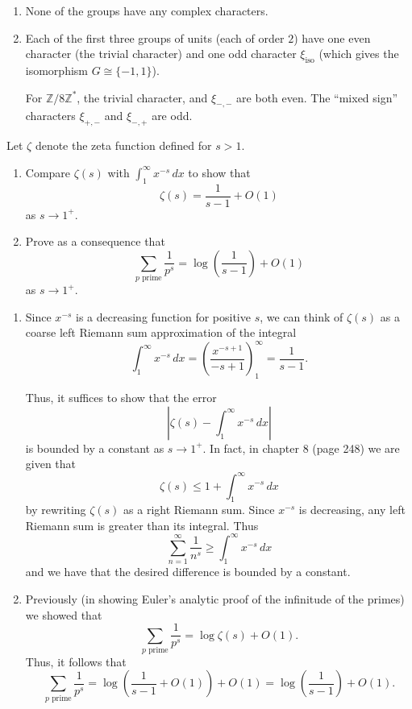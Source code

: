 \documentclass[12 pt, letterpaper]{hmcpset}
\begin{document}
\begin{solution}
	\begin{enumerate}
		\item None of the groups have any complex characters.

		\item Each of the first three groups of units (each of order $2$) have one even character (the trivial character) and one odd character $\xi_{\text{iso}}$ (which gives the isomorphism $G \cong \{ -1, 1 \}$).

			For $\mathbb{Z} / 8 \mathbb{Z}^{*}$, the trivial character, and $\xi_{-, -}$ are both even. The ``mixed sign'' characters $\xi_{+, -}$ and $\xi_{-, +}$ are odd.
	\end{enumerate}
\end{solution}

\pagebreak

\begin{problem}[S \& S \S 8.4 \#8]
	Let $\zeta$ denote the zeta function defined for $s > 1$.
	\begin{enumerate}
		\item Compare $\zeta(s)$ with $\int_{1}^{\infty} x^{-s} \, dx$ to show that
			\[
				\zeta(s) = \frac{1}{s - 1} + O(1)
			\]
			as $s \to 1^{+}$.

		\item Prove as a consequence that
			\[
				\sum_{p \text{ prime}} \frac{1}{p^{s}} = \log \left ( \frac{1}{s - 1} \right ) + O(1)
			\]
			as $s \to 1^{+}$.
	\end{enumerate}
\end{problem}

\begin{solution}
	\begin{enumerate}
		\item Since $x^{-s}$ is a decreasing function for positive $s$, we can think of $\zeta(s)$ as a coarse left Riemann sum approximation of the integral
			\[
				\int_{1}^{\infty} x^{-s} \, dx = \left ( \frac{x^{-s + 1}}{-s + 1} \right )_{1}^{\infty} = \frac{1}{s - 1}.
			\]

			Thus, it suffices to show that the error
			\[
				\left \lvert \zeta(s) - \int_{1}^{\infty} x^{-s} \, dx \right \rvert
			\]
			is bounded by a constant as $s \to 1^{+}$. In fact, in chapter 8 (page 248) we are given that
			\[
				\zeta(s) \le 1 + \int_{1}^{\infty} x^{-s} \, dx
			\]
			by rewriting $\zeta(s)$ as a right Riemann sum. Since $x^{-s}$ is decreasing, any left Riemann sum is greater than its integral. Thus
			\[
				\sum_{n = 1}^{\infty} \frac{1}{n^{s}} \ge \int_{1}^{\infty} x^{-s} \, dx 
			\]
			and we have that the desired difference is bounded by a constant.

		\item Previously (in showing Euler's analytic proof of the infinitude of the primes) we showed that
			\[
				\sum_{p \text{ prime}} \frac{1}{p^{s}} = \log \zeta(s) + O(1).
			\]
			Thus, it follows that
			\[
				\sum_{p \text{ prime}} \frac{1}{p^{s}} = \log \left ( \frac{1}{s - 1} + O(1) \right ) + O(1) = \log \left ( \frac{1}{s - 1} \right ) + O(1).
			\]
	\end{enumerate}
\end{solution}
\end{document}
